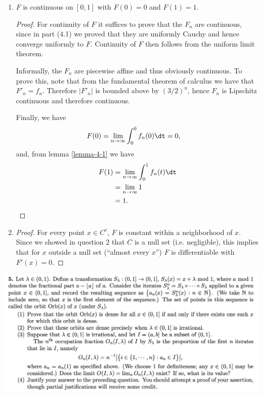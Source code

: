 \begin{enumerate}[label=(4.\arabic*)]
\begin{proof}
    Since the sequence $F_0(x), F_1(x), \ldots$ is Cauchy for all $x \in [0, 1]$, the
    limit $F(x) = \lim_{n\to\infty} F_n(x)$ exists for all $x \in [0, 1]$.

    Furthermore, the same $m$ works for all $x$, i.e. the sequence is uniformly Cauchy.
  \end{proof}

\item
  \begin{claim*}
    $F$ is continuous on $[0, 1]$ with $F(0) = 0$ and $F(1) = 1$.
  \end{claim*}

  \begin{proof}
    For continuity of $F$ it suffices to prove that the $F_n$ are continuous, since in part (4.1) we proved
    that they are uniformly Cauchy and hence converge uniformly to $F$. Continuity of $F$ then follows from the
    uniform limit theorem.

    Informally, the $F_n$ are piecewise affine and thus obviously continuous. To prove this, note that from
    the fundamental theorem of calculus we have that $F'_n = f_n$. Therefore $|F'_n|$ is bounded above
    by $(3/2)^n$, hence $F_n$ is Lipschitz continuous and therefore continuous.

    Finally, we have
    \begin{align*}
      F(0) &= \lim_{n\to\infty} \int_0^0 f_n(0) \dt = 0,
    \end{align*}
    and, from lemma \ref{lemma-4-1} we have
    \begin{align*}
      F(1)
      &= \lim_{n\to\infty} \int_0^1 f_n(t) \dt \\
      &= \lim_{n\to\infty} 1 \\
      &= 1.
    \end{align*}
  \end{proof}


\item
  \begin{proof}
    For every point $x \in C^c$, $F$ is constant within a neighborhood of $x$. Since we showed in question 2
    that $C$ is a null set (i.e. negligible), this implies that for $x$ outside a null set (``almost
    every $x$​'') $F$ is differentiable with $F'(x) = 0$.
  \end{proof}
\end{enumerate}


\newpage
\begin{mdframed}
  \includegraphics[width=400pt]{img/analysis--berkeley-202a-hw-8c2b.png}
\end{mdframed}

